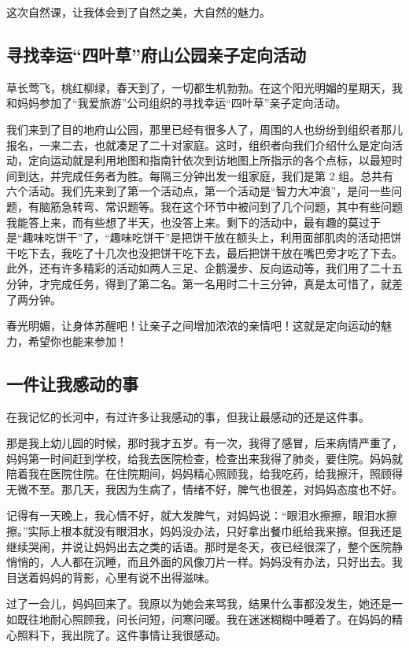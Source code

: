 \documentclass[UTF8,a4paper,titlepage,twoside,10.5pt]{article}
\begin{document}
这次自然课，让我体会到了自然之美，大自然的魅力。

\subsection{寻找幸运“四叶草”府山公园亲子定向活动}
\label{sec:org1f98cb6}

草长莺飞，桃红柳绿，春天到了，一切都生机勃勃。在这个阳光明媚的星期天，我和妈妈参加了“我爱旅游”公司组织的寻找幸运“四叶草”亲子定向活动。

我们来到了目的地府山公园，那里已经有很多人了，周围的人也纷纷到组织者那儿报名，一来二去，也就凑足了二十对家庭。这时，组织者向我们介绍什么是定向活动，定向运动就是利用地图和指南针依次到访地图上所指示的各个点标，以最短时间到达，并完成任务者为胜。每隔三分钟出发一组家庭，我们是第 2 组。总共有六个活动。我们先来到了第一个活动点，第一个活动是“智力大冲浪”，是问一些问题，有脑筋急转弯、常识题等。我在这个环节中被问到了几个问题，其中有些问题我能答上来，而有些想了半天，也没答上来。剩下的活动中，最有趣的莫过于是“趣味吃饼干”了，“趣味吃饼干”是把饼干放在额头上，利用面部肌肉的活动把饼干吃下去，我吃了十几次也没把饼干吃下去，最后把饼干放在嘴巴旁才吃了下去。此外，还有许多精彩的活动如两人三足、企鹅漫步、反向运动等，我们用了二十五分钟，才完成任务，得到了第二名。第一名用时二十三分钟，真是太可惜了，就差了两分钟。

春光明媚，让身体苏醒吧！让亲子之间增加浓浓的亲情吧！这就是定向运动的魅力，希望你也能来参加！

\subsection{一件让我感动的事}
\label{sec:org20d809c}

在我记忆的长河中，有过许多让我感动的事，但我让最感动的还是这件事。

那是我上幼儿园的时候，那时我才五岁。有一次，我得了感冒，后来病情严重了，妈妈第一时间赶到学校，给我去医院检查，检查出来我得了肺炎，要住院。妈妈就陪着我在医院住院。在住院期间，妈妈精心照顾我，给我吃药，给我擦汗，照顾得无微不至。那几天，我因为生病了，情绪不好，脾气也很差，对妈妈态度也不好。

记得有一天晚上，我心情不好，就大发脾气，对妈妈说：“眼泪水擦擦，眼泪水擦擦。”实际上根本就没有眼泪水，妈妈没办法，只好拿出餐巾纸给我来擦。但我还是继续哭闹，并说让妈妈出去之类的话语。那时是冬天，夜已经很深了，整个医院静悄悄的，人人都在沉睡，而且外面的风像刀片一样。妈妈没有办法，只好出去。我目送着妈妈的背影，心里有说不出得滋味。

过了一会儿，妈妈回来了。我原以为她会来骂我，结果什么事都没发生，她还是一如既往地耐心照顾我，问长问短，问寒问暖。我在迷迷糊糊中睡着了。在妈妈的精心照料下，我出院了。这件事情让我很感动。
\end{document}
